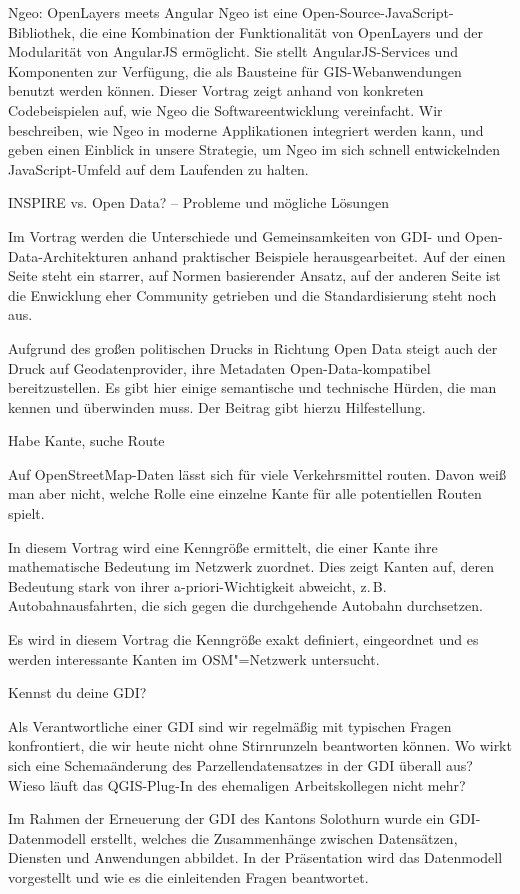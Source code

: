 \renewcommand{\konferenztag}{\donnerstag}
%
{Ngeo: OpenLayers meets Angular}%
{}%
{Ngeo ist eine Open-Source-JavaScript-Bibliothek, die eine Kombination der Funktionalität von
OpenLayers und der Modularität von AngularJS ermöglicht. Sie stellt AngularJS-Services und
Komponenten zur Verfügung, die als Bausteine für GIS-Webanwendungen benutzt werden können. Dieser
Vortrag zeigt anhand von konkreten Codebeispielen auf, wie Ngeo die Softwareentwicklung vereinfacht.
Wir beschreiben, wie Ngeo in moderne Applikationen integriert werden kann, und geben einen Einblick
in unsere Strategie, um Ngeo im sich schnell entwickelnden JavaScript-Umfeld auf dem Laufenden zu
halten.}


%
{INSPIRE vs. Open Data? -- Probleme und mögliche Lösungen}%
{}%
{Im Vortrag werden die Unterschiede und Gemeinsamkeiten von GDI- und Open-Data-Architekturen anhand
praktischer Beispiele herausgearbeitet. Auf der einen Seite steht ein starrer, auf Normen
basierender Ansatz, auf der anderen Seite ist die Enwicklung eher Community getrieben und die
Standardisierung steht noch aus.

Aufgrund des großen politischen Drucks in Richtung Open Data steigt
auch der Druck auf Geodatenprovider, ihre Metadaten Open-Data-kompatibel bereitzustellen. Es gibt
hier einige semantische und technische Hürden, die man kennen und überwinden muss. Der Beitrag gibt
hierzu Hilfestellung.}

%
{Habe Kante, suche Route}%
{}%
{Auf OpenStreetMap-Daten lässt sich für viele Verkehrsmittel routen. Davon weiß man aber nicht,
  welche Rolle eine einzelne Kante für alle potentiellen Routen spielt.

In diesem Vortrag wird eine Kenngröße ermittelt, die einer Kante ihre mathematische Bedeutung im
Netzwerk zuordnet. Dies zeigt Kanten auf, deren Bedeutung stark von ihrer a-priori-Wichtigkeit
abweicht, z.\,B. Autobahnausfahrten, die sich gegen die durchgehende Autobahn durchsetzen.

Es wird in diesem Vortrag die Kenngröße exakt definiert, eingeordnet
und es werden interessante Kanten im OSM"=Netzwerk untersucht.
}

%
{Kennst du deine GDI?}%
{}%
{Als Verantwortliche einer GDI sind wir regelmäßig mit typischen Fragen konfrontiert, die wir heute
  nicht ohne Stirnrunzeln beantworten können. Wo wirkt sich eine Schemaänderung des
  Parzellendatensatzes in der GDI überall aus? Wieso läuft das QGIS-Plug-In des ehemaligen
  Arbeitskollegen nicht mehr?

Im Rahmen der Erneuerung der GDI des Kantons Solothurn wurde ein GDI-Datenmodell erstellt, welches
die Zusammenhänge zwischen Datensätzen, Diensten und Anwendungen abbildet. In der Präsentation wird
das Datenmodell vorgestellt und wie es die einleitenden Fragen beantwortet.}

